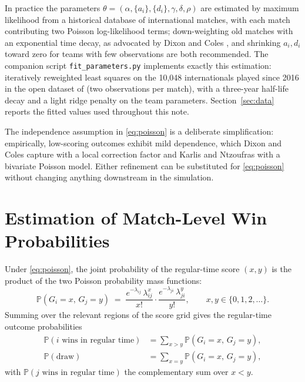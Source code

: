 \documentclass[11pt]{article}
\newcommand{\Prob}{\mathbb{P}}
\begin{document}
In practice the parameters
$\theta = (\alpha, \{a_i\}, \{d_i\}, \gamma, \delta, \rho)$ are estimated by
maximum likelihood from a historical database of international matches, with
each match contributing two Poisson log-likelihood terms; down-weighting old
matches with an exponential time decay, as advocated by Dixon and Coles
\cite{dixon1997modelling}, and shrinking $a_i, d_i$ toward zero for teams with
few observations are both recommended. The companion script
\texttt{fit\_parameters.py} implements exactly this estimation: iteratively
reweighted least squares on the 10{,}048 internationals played since 2016 in
the open dataset of \cite{martj42results} (two observations per match), with
a three-year half-life decay and a light ridge penalty on the team
parameters. Section~\ref{sec:data} reports the fitted values used throughout
this note.

The independence assumption in \eqref{eq:poisson} is a deliberate
simplification: empirically, low-scoring outcomes exhibit mild dependence,
which Dixon and Coles \cite{dixon1997modelling} capture with a local
correction factor and Karlis and Ntzoufras \cite{karlis2003analysis} with a
bivariate Poisson model. Either refinement
can be substituted for \eqref{eq:poisson} without changing anything downstream
in the simulation.

\section{Estimation of Match-Level Win Probabilities}
\label{sec:matchprob}

Under \eqref{eq:poisson}, the joint probability of the regular-time score
$(x, y)$ is the product of the two Poisson probability mass functions:
\begin{equation}
\Prob(G_i = x,\, G_j = y)
\;=\;
\frac{e^{-\lambda_{ij}}\,\lambda_{ij}^{x}}{x!}
\cdot
\frac{e^{-\lambda_{ji}}\,\lambda_{ji}^{y}}{y!},
\qquad x, y \in \{0, 1, 2, \dots\}.
\label{eq:jointpmf}
\end{equation}
Summing over the relevant regions of the score grid gives the regular-time
outcome probabilities
\begin{align}
\Prob(i \text{ wins in regular time})
&= \sum_{x > y} \Prob(G_i = x,\, G_j = y),
\label{eq:winRT}\\
\Prob(\text{draw})
&= \sum_{x = y} \Prob(G_i = x,\, G_j = y),
\label{eq:draw}
\end{align}
with $\Prob(j \text{ wins in regular time})$ the complementary sum over
$x < y$.
\end{document}
